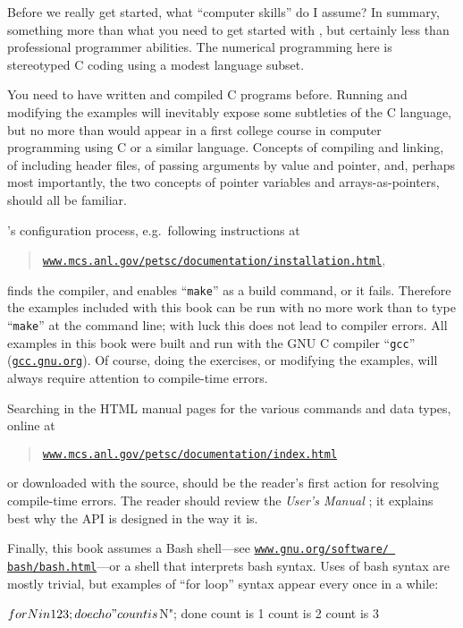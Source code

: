 Before we really get started, what ``computer skills'' do I assume?  In summary, something more than what you need to get started with \Matlab, but certainly less than professional programmer abilities.  The numerical programming here is stereotyped C coding using a modest language subset.

You need to have written and compiled C programs before.   Running and modifying the examples will inevitably expose some subtleties of the C language, but no more than would appear in a first college course in computer programming using C or a similar language.  Concepts of compiling and linking, of including header files, of passing arguments by value and pointer, and, perhaps most importantly, the two concepts of pointer variables and arrays-as-pointers, should all be familiar.

\PETSc's configuration process, e.g.~following instructions at
\begin{quote}
\href{http://www.mcs.anl.gov/petsc/documentation/installation.html}{\texttt{www.mcs.anl.gov/petsc/documentation/installation.html}},
\end{quote}
finds the compiler, and enables ``\texttt{make}'' as a build command, or it fails.  Therefore the examples included with this book can be run with no more work than to type ``\texttt{make}'' at the command line; with luck this does not lead to compiler errors.  All examples in this book were built and run with the GNU C compiler ``\texttt{gcc}'' (\href{https://gcc.gnu.org/}{\texttt{gcc.gnu.org}}).  Of course, doing the exercises, or modifying the examples, will always require attention to compile-time errors.

Searching in the \PETSc HTML manual pages for the various commands and data types, online at
\begin{quote}
\href{http://www.mcs.anl.gov/petsc/documentation/index.html}{\texttt{www.mcs.anl.gov/petsc/documentation/index.html}}
\end{quote}
or downloaded with the \PETSc source, should be the reader's first action for resolving compile-time errors.  The reader should review the \emph{\PETSc User's Manual} \citep{petsc-user-ref}; it explains best why the API is designed in the way it is.

Finally, this book assumes a Bash shell---see  \href{https://www.gnu.org/software/bash/bash.html}{\texttt{www.gnu.org/software/ bash/bash.html}}---or a shell that interprets bash syntax.  Uses of bash syntax are mostly trivial, but examples of ``for loop'' syntax appear every once in a while:
\begin{cline}
$ for N in 1 2 3; do echo "count is $N"; done
count is 1
count is 2
count is 3
\end{cline}

